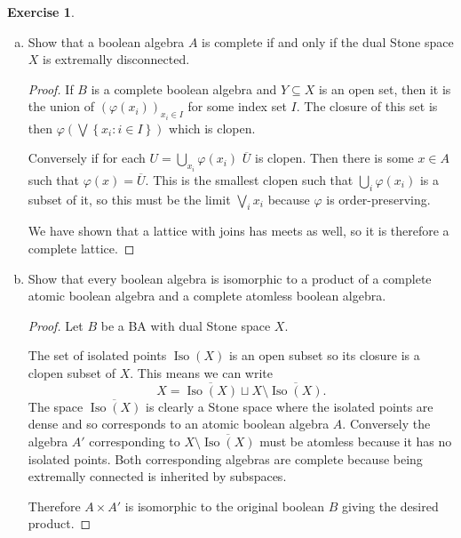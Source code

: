 \documentclass{article}
\newcommand{\set}[1]{\left\{#1\right\}}
\newcommand{\setwith}[2]{\set{#1:#2}}
\DeclareMathOperator{\iso}{Iso}
\theoremstyle{definition}
\newtheorem{question}{Exercise}
\begin{document}
\begin{question}
    \begin{enumerate}[a)]
        \item Show that a boolean algebra \(A\) is complete if and only if the
              dual Stone space \(X\) is extremally disconnected.

              \begin{proof}
                  If \(B\) is a complete boolean algebra and \(Y\subseteq X\) is
                  an open set, then it is the union of
                  \((\varphi(x_{i}))_{x_{i}\in I}\) for some index set \(I\).
                  The closure of this set is then
                  \(\varphi(\bigvee\setwith{x_{i}}{i\in I})\) which is clopen.

                  Conversely if for each \(U=\bigcup_{x_{i}}\varphi(x_{i})\)
                  \(\overline{U}\) is clopen. Then there is some \(x\in A\) such
                  that \(\varphi(x)=\overline{U}\). This is the smallest clopen
                  such that \(\bigcup_{i}\varphi(x_{i})\) is a subset of it, so
                  this must be the limit \(\bigvee_{i}x_{i}\) because
                  \(\varphi\) is order-preserving.

                  We have shown that a lattice with joins has meets as well,
                  so it is therefore a complete lattice.
              \end{proof}

        \item Show that every boolean algebra is isomorphic to a product of a
              complete atomic boolean algebra and a complete atomless boolean
              algebra.

              \begin{proof}
                  Let \(B\) be a BA with dual Stone space \(X\).

                  The set of isolated points \(\iso(X)\) is an open subset so
                  its closure is a clopen subset of \(X\). This means we can
                  write
                  \[
                      X=\overline{\iso(X)}\sqcup X\setminus\overline{\iso(X)}.
                  \]
                  The space \(\overline{\iso(X)}\) is clearly a Stone space
                  where the isolated points are dense and so corresponds to an
                  atomic boolean algebra \(A\). Conversely the algebra \(A'\)
                  corresponding to \(X\setminus\overline{\iso(X)}\) must be
                  atomless because it has no isolated points. Both corresponding
                  algebras are complete because being extremally connected is
                  inherited by subspaces.

                  Therefore \(A\times A'\) is isomorphic to the original boolean
                  \(B\) giving the desired product.
              \end{proof}
    \end{enumerate}
\end{question}
\end{document}
